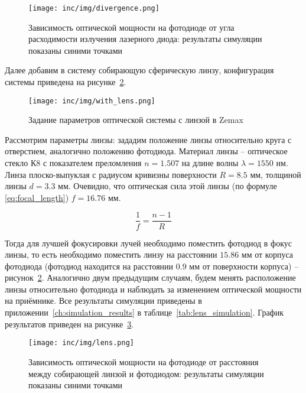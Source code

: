 \begin{figure}[h]
    \centering
    \texttt{[image: inc/img/divergence.png]}
    \caption{Зависимость оптической мощности на фотодиоде от угла расходимости излучения лазерного диода: результаты симуляции показаны синими точками}
    \label{fig:divergence_plot}
\end{figure}

Далее добавим в систему собирающую сферическую линзу, конфигурация системы приведена на рисунке~\ref{fig:with_lens_zemax}. 

\begin{figure}[!h]
    \centering
    \texttt{[image: inc/img/with\_lens.png]}
    \caption{Задание параметров оптической системы с линзой в Zemax}
    \label{fig:with_lens_zemax}
\end{figure}

Рассмотрим параметры линзы: зададим положение линзы относительно круга с отверстием, аналогично положению фотодиода. Материал линзы \--- оптическое стекло К8 с показателем преломления $n = 1.507$ на длине волны $\lambda = 1550$ нм. Линза плоско-выпуклая с радиусом кривизны поверхности $R = 8.5$ мм, толщиной линзы $d = 3.3$ мм. Очевидно, что оптическая сила этой линзы (по формуле \eqref{eq:focal_length}) $f = 16.76$ мм. 

\begin{equation}
    \frac{1}{f} = \frac{n-1}{R}
    \label{eq:focal_length}
\end{equation}

Тогда для лучшей фокусировки лучей необходимо поместить фотодиод в фокус линзы, то есть необходимо поместить линзу на расстоянии $15.86$ мм от корпуса фотодиода (фотодиод находится на расстоянии $0.9$ мм от поверхности корпуса) \--- рисунок~\ref{fig:with_lens_zemax}. Аналогично двум предыдущим случаям, будем менять расположение линзы относительно фотодиода и наблюдать за изменением оптической мощности на приёмнике. Все результаты симуляции приведены в приложении~\ref{ch:simulation_results} в таблице~\ref{tab:lens_simulation}. График результатов приведен на рисунке~\ref{fig:lens_plot}.

\begin{figure}[h]
    \centering
    \texttt{[image: inc/img/lens.png]}
    \caption{Зависимость оптической мощности на фотодиоде от расстояния между собирающей линзой и фотодиодом: результаты симуляции показаны синими точками}
    \label{fig:lens_plot}
\end{figure}

